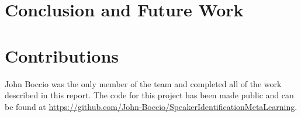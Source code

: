 \documentclass{article}
\begin{document}

\section{Conclusion and Future Work}

\section{Contributions}
John Boccio was the only member of the team and completed all of the work described in this report. The code for this 
project has been made public and can be found at 
\href{https://github.com/John-Boccio/SpeakerIdentificationMetaLearning}{https://github.com/John-Boccio/SpeakerIdentificationMetaLearning}.
\end{document}
